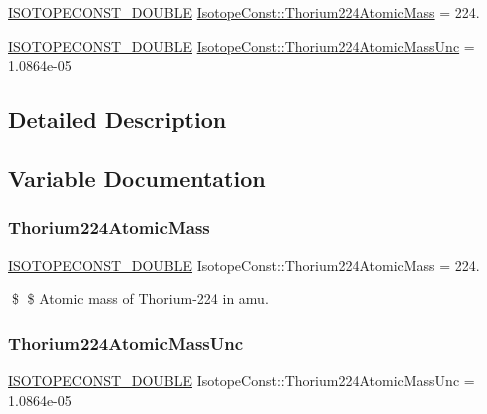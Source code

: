 \begin{DoxyCompactItemize}
\item 
\mbox{\hyperlink{group___isotope_const-_macros_ga8f45a7272ce02c0b4c65c44636ed719a}{I\+S\+O\+T\+O\+P\+E\+C\+O\+N\+S\+T\+\_\+\+D\+O\+U\+B\+LE}} \mbox{\hyperlink{group___isotope_const-_thorium-_th224_gaa1246a0b2d3f41a5f80abf4400b0fd38}{Isotope\+Const\+::\+Thorium224\+Atomic\+Mass}} = 224.
\item 
\mbox{\hyperlink{group___isotope_const-_macros_ga8f45a7272ce02c0b4c65c44636ed719a}{I\+S\+O\+T\+O\+P\+E\+C\+O\+N\+S\+T\+\_\+\+D\+O\+U\+B\+LE}} \mbox{\hyperlink{group___isotope_const-_thorium-_th224_ga245a1535b4eb57857ceea6d522545631}{Isotope\+Const\+::\+Thorium224\+Atomic\+Mass\+Unc}} = 1.\+0864e-\/05
\end{DoxyCompactItemize}


\subsection{Detailed Description}


\subsection{Variable Documentation}
\mbox{\label{group___isotope_const-_thorium-_th224_gaa1246a0b2d3f41a5f80abf4400b0fd38}} 
\subsubsection{\texorpdfstring{Thorium224\+Atomic\+Mass}{Thorium224AtomicMass}}
{\footnotesize\ttfamily \mbox{\hyperlink{group___isotope_const-_macros_ga8f45a7272ce02c0b4c65c44636ed719a}{I\+S\+O\+T\+O\+P\+E\+C\+O\+N\+S\+T\+\_\+\+D\+O\+U\+B\+LE}} Isotope\+Const\+::\+Thorium224\+Atomic\+Mass = 224.}

\$ \$ Atomic mass of Thorium-\/224 in amu. \mbox{\label{group___isotope_const-_thorium-_th224_ga245a1535b4eb57857ceea6d522545631}} 
\subsubsection{\texorpdfstring{Thorium224\+Atomic\+Mass\+Unc}{Thorium224AtomicMassUnc}}
{\footnotesize\ttfamily \mbox{\hyperlink{group___isotope_const-_macros_ga8f45a7272ce02c0b4c65c44636ed719a}{I\+S\+O\+T\+O\+P\+E\+C\+O\+N\+S\+T\+\_\+\+D\+O\+U\+B\+LE}} Isotope\+Const\+::\+Thorium224\+Atomic\+Mass\+Unc = 1.\+0864e-\/05}

